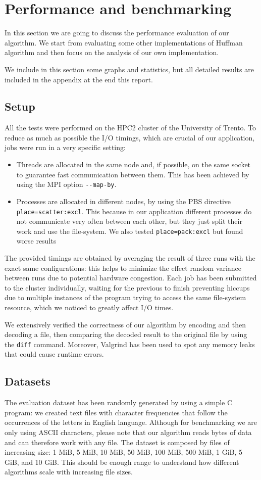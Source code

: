 \section{Performance and benchmarking}
In this section we are going to discuss the performance evaluation of our algorithm. We start from evaluating some other implementations of Huffman algorithm and then focus on the analysis of our own implementation. 

We include in this section some graphs and statistics, but all detailed results are included in the appendix at the end this report.
\subsection{Setup}
All the tests were performed on the HPC2 cluster of the University of Trento. To reduce as much as possible the I/O timings, which are crucial of our application, jobs were run in a very specific setting:

\begin{itemize}
	\item Threads are allocated in the same node and, if possible, on the same socket to guarantee fast communication between them. This has been achieved by using the MPI option \verb|--map-by|.
	\item Processes are allocated in different nodes, by using the PBS directive \verb|place=scatter:excl|. This because in our application different processes do not communicate very often between each other, but they just split their work and use the file-system. We also tested \verb|place=pack:excl| but found worse results
\end{itemize}

The provided timings are obtained by averaging the result of three runs with the exact same configurations: this helps to minimize the effect random variance between runs due to potential hardware congestion.
Each job has been submitted to the cluster individually, waiting for the previous to finish preventing hiccups due to multiple instances of the program trying to access the same file-system resource, which we noticed to greatly affect I/O times.

We extensively verified the correctness of our algorithm by encoding and then decoding a file, then comparing the decoded result to the original file by using the \verb|diff| command. Moreover, Valgrind has been used to spot any memory leaks that could cause runtime errors.

\subsection{Datasets}
The evaluation dataset has been randomly generated by using a simple C program: we created text files with character frequencies that follow the occurrences of the letters in English language. Although for benchmarking we are only using ASCII characters, please note that our algorithm reads bytes of data and can therefore work with any file.
The dataset is composed by files of increasing size: 1 MiB, 5 MiB, 10 MiB, 50 MiB, 100 MiB, 500 MiB, 1 GiB, 5 GiB, and 10 GiB. This should be enough range to understand how different algorithms scale with increasing file sizes.

